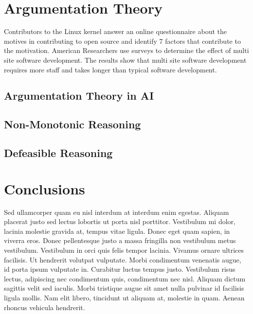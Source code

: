 \subsection{}

\subsection{}


\section{Argumentation Theory}

Contributors to the Linux kernel answer an online questionnaire about the motives in contributing to open source and identify 7 factors that contribute to the motivation.\cite{Questionnaire1}
American Researchers use surveys to determine the effect of multi site software development. The results show that multi site software development requires more staff and takes longer than typical software development.\cite{Questionnaire2}

\subsection{Argumentation Theory in AI}

\subsection{Non-Monotonic Reasoning}

\subsection{Defeasible Reasoning}



\section{Conclusions}

Sed ullamcorper quam eu nisl interdum at interdum enim egestas. Aliquam placerat justo sed lectus lobortis ut porta nisl porttitor. Vestibulum mi dolor, lacinia molestie gravida at, tempus vitae ligula. Donec eget quam sapien, in viverra eros. Donec pellentesque justo a massa fringilla non vestibulum metus vestibulum. Vestibulum in orci quis felis tempor lacinia. Vivamus ornare ultrices facilisis. Ut hendrerit volutpat vulputate. Morbi condimentum venenatis augue, id porta ipsum vulputate in. Curabitur luctus tempus justo. Vestibulum risus lectus, adipiscing nec condimentum quis, condimentum nec nisl. Aliquam dictum sagittis velit sed iaculis. Morbi tristique augue sit amet nulla pulvinar id facilisis ligula mollis. Nam elit libero, tincidunt ut aliquam at, molestie in quam. Aenean rhoncus vehicula hendrerit.
